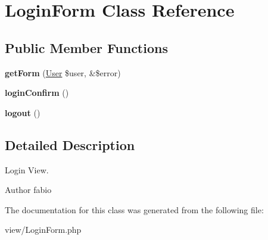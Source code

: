 \hypertarget{classLoginForm}{\section{Login\+Form Class Reference}
\label{classLoginForm}
}
\subsection*{Public Member Functions}
\begin{DoxyCompactItemize}
\item 
\hypertarget{classLoginForm_af84f923c24f3be4056a7a0a752404191}{{\bfseries get\+Form} (\hyperlink{classUser}{User} \$user, \&\$error)}\label{classLoginForm_af84f923c24f3be4056a7a0a752404191}

\item 
\hypertarget{classLoginForm_a4e5b5e07892ff4a8f0f02a8fc6d94d12}{{\bfseries login\+Confirm} ()}\label{classLoginForm_a4e5b5e07892ff4a8f0f02a8fc6d94d12}

\item 
\hypertarget{classLoginForm_ae937bc750deebf50766a6fc7e0831a52}{{\bfseries logout} ()}\label{classLoginForm_ae937bc750deebf50766a6fc7e0831a52}

\end{DoxyCompactItemize}


\subsection{Detailed Description}
Login View.

\begin{DoxyAuthor}{Author}
fabio 
\end{DoxyAuthor}


The documentation for this class was generated from the following file\+:\begin{DoxyCompactItemize}
\item 
view/Login\+Form.\+php\end{DoxyCompactItemize}
